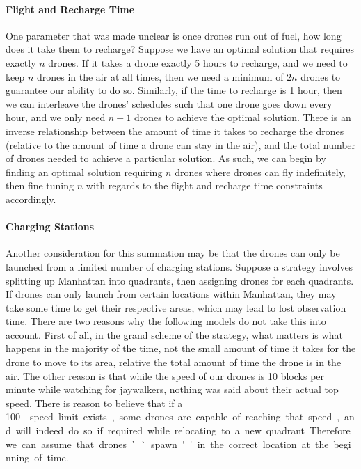 \documentclass{article}
\begin{document}
\paragraph{Flight and Recharge Time}
\label{par:flight_and_recharge_time}
One parameter that was made unclear is once drones run out of fuel, how long does it take them to recharge? Suppose we have an optimal solution that requires exactly $n$ drones. If it takes a drone exactly 5 hours to recharge, and we need to keep $n$ drones in the air at all times, then we need a minimum of $2n$ drones to guarantee our ability to do so. Similarly, if the time to recharge is 1 hour, then we can interleave the drones' schedules such that one drone goes down every hour, and we only need $n+1$ drones to achieve the optimal solution. There is an inverse relationship between the amount of time it takes to recharge the drones (relative to the amount of time a drone can stay in the air), and the total number of drones needed to achieve a particular solution. As such, we can begin by finding an optimal solution requiring $n$ drones where drones can fly indefinitely, then fine tuning $n$ with regards to the flight and recharge time constraints accordingly.
\paragraph{Charging Stations}
\label{par:charging_stations}
Another consideration for this summation may be that the drones can only be launched from a limited number of charging stations. Suppose a strategy involves splitting up Manhattan into quadrants, then assigning drones for each quadrants. If drones can only launch from certain locations within Manhattan, they may take some time to get their respective areas, which may lead to lost observation time. There are two reasons why the following models do not take this into account. First of all, in the grand scheme of the strategy, what matters is what happens in the majority of the time, not the small amount of time it takes for the drone to move to its area, relative the total amount of time the drone is in the air. The other reason is that while the speed of our drones is 10 blocks per minute while watching for jaywalkers, nothing was said about their actual top speed. There is reason to believe that if a \SI{100}\mph speed limit exists, some drones are capable of reaching that speed, and will indeed do so if required while relocating to a new quadrant. Therefore we can assume that drones ``spawn'' in the correct location at the beginning of time.
\end{document}
